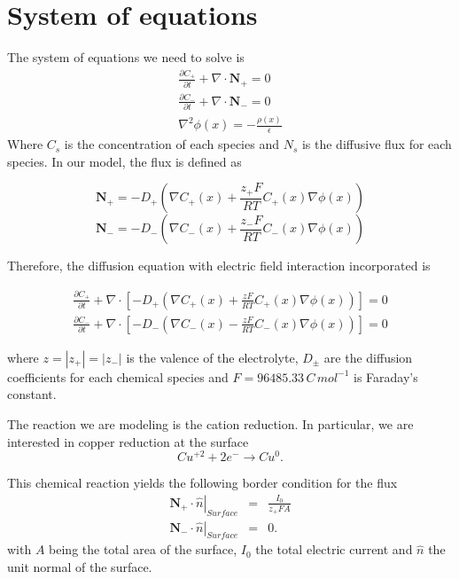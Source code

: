 \section{System of equations}

The system of equations we need to solve is 
\begin{eqnarray}
\frac{\partial C_+}{\partial t}+\nabla\cdot \mathbf{N}_+ = 0 \\
\frac{\partial C_-}{\partial t}+\nabla\cdot \mathbf{N}_- = 0 \\
\nabla^2\phi(x)=-\frac{\rho(x)}{\epsilon}
\end{eqnarray}
Where $C_s$ is the concentration of each species and $N_s$ is the diffusive flux for each species.
In our model, the flux is defined as

$$\mathbf{N}_+= -D_+\left(\nabla C_+(x) +\frac{z_+ F}{RT}C_+(x)\nabla\phi(x)\right)$$
$$\mathbf{N}_-= -D_-\left(\nabla C_-(x) +\frac{z_- F}{RT}C_-(x)\nabla\phi(x)\right)$$

Therefore, the diffusion equation with electric field interaction incorporated is \cite{Dolde2011}

\begin{eqnarray}
\frac{\partial C_+}{\partial t}+\nabla\cdot\left[ -D_+\left(\nabla C_+(x) +\frac{z F}{RT}C_+(x)\nabla\phi(x)\right)\right]= 0 \\
\frac{\partial C_-}{\partial t}+\nabla\cdot\left[ -D_-\left(\nabla C_-(x) -\frac{z F}{RT}C_-(x)\nabla\phi(x)\right)\right] = 0 
\end{eqnarray}

where $z = |z_+|=|z_-|$ is the valence of the electrolyte, $D_{\pm}$ are the diffusion coefficients for each chemical species and $F = 96485.33\,C\,mol^{-1}$ is Faraday's constant.

The reaction we are modeling is the cation reduction. In particular, we are interested in copper reduction at the surface
\begin{equation}
Cu^{+2} + 2 e^{-} \rightarrow Cu^{0}.
\end{equation}

This chemical reaction yields the following border condition for the flux
\begin{eqnarray}
\left.\mathbf{N}_{+}\cdot\hat{n}\right|_{Surface} &=& \frac{I_{0}}{z_{+}FA}\nonumber\\
\left.\mathbf{N}_{-}\cdot\hat{n}\right|_{Surface} &=& 0.
\label{eq_bc1}
\end{eqnarray}
with $A$ being the total area of the surface, $I_{0}$ the total electric current and $\hat{n}$ the unit normal of the surface.